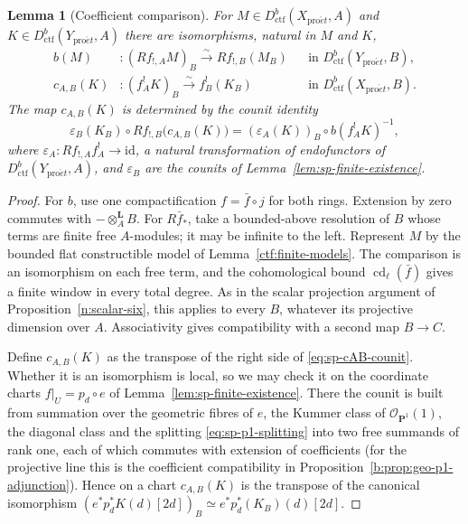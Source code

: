 \documentclass[11pt,a4paper]{article}
\numberwithin{equation}{section}
\newtheorem{lemma}[theorem]{Lemma}
\theoremstyle{definition}
\theoremstyle{remark}
\newcommand{\proet}{\mathrm{pro}\acute{e}t}
\newcommand{\Dctf}{D^b_{\mathrm{ctf}}}
\begin{document}
\begin{lemma}[Coefficient comparison]
\label{lem:sp-reduction}
For $M\in\Dctf(X_{\proet},A)$ and $K\in\Dctf(Y_{\proet},A)$ there are
isomorphisms, natural in $M$ and $K$,
\[
\begin{aligned}
 b(M)&:(Rf_{!,A}M)_B\xrightarrow{\sim} Rf_{!,B}(M_B)
 &&\text{in }\Dctf(Y_{\proet},B),\\
 c_{A,B}(K)&:(f_A^!K)_B\xrightarrow{\sim}f_B^!(K_B)
 &&\text{in }\Dctf(X_{\proet},B).
\end{aligned}
\]
The map $c_{A,B}(K)$ is determined by the counit identity
\begin{equation}\label{eq:sp-cAB-counit}
 \varepsilon_B(K_B)\circ Rf_{!,B}\bigl(c_{A,B}(K)\bigr)
 =(\varepsilon_A(K))_B\circ b(f_A^!K)^{-1},
\end{equation}
where $\varepsilon_A:Rf_{!,A}f_A^!\to\mathrm{id}$, a natural
transformation of endofunctors of $\Dctf(Y_{\proet},A)$, and
$\varepsilon_B$ are the counits of Lemma~\ref{lem:sp-finite-existence}.
\end{lemma}
\begin{proof}
For $b$, use one compactification $f=\bar f\circ j$ for both rings.
Extension by zero commutes with $-\otimes^{\mathbf L}_AB$. For
$R\bar f_*$, take a bounded-above resolution of $B$ whose terms are
finite free $A$-modules; it may be infinite to the left. Represent $M$
by the bounded flat constructible model of
Lemma~\ref{ctf:finite-models}. The comparison is an isomorphism on
each free term, and the cohomological bound
$\operatorname{cd}_\ell(\bar f)$ gives a finite window in every
total degree. As in the scalar projection argument of
Proposition~\ref{n:scalar-six}, this applies to every $B$, whatever its
projective dimension over $A$. Associativity gives compatibility
with a second map $B\to C$.

Define $c_{A,B}(K)$ as the transpose of the right side of
\eqref{eq:sp-cAB-counit}. Whether it is an isomorphism is local, so we
may check it on the coordinate charts $f|_U=p_d\circ e$ of
Lemma~\ref{lem:sp-finite-existence}. There the counit is built from
summation over the geometric fibres of $e$, the Kummer class of
$\mathcal O_{\mathbf P^1}(1)$, the diagonal class and the splitting
\eqref{eq:sp-p1-splitting} into two free summands of rank one, each of
which commutes with extension of coefficients (for the projective line
this is the coefficient compatibility in
Proposition~\ref{b:prop:geo-p1-adjunction}). Hence on a chart
$c_{A,B}(K)$ is the transpose of the canonical isomorphism
$(e^*p_d^*K(d)[2d])_B\simeq e^*p_d^*(K_B)(d)[2d]$.
\end{proof}
\end{document}
